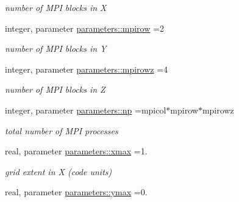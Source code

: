 \begin{DoxyCompactItemize}
\begin{DoxyCompactList}\small\item\em number of M\+P\+I blocks in X \end{DoxyCompactList}\item 
\hypertarget{namespaceparameters_a15b7777c042a615b8c2d18578682e177}{}integer, parameter \hyperlink{namespaceparameters_a15b7777c042a615b8c2d18578682e177}{parameters\+::mpirow} =2\label{namespaceparameters_a15b7777c042a615b8c2d18578682e177}

\begin{DoxyCompactList}\small\item\em number of M\+P\+I blocks in Y \end{DoxyCompactList}\item 
\hypertarget{namespaceparameters_aeb329f6b921d76584073753e2596e410}{}integer, parameter \hyperlink{namespaceparameters_aeb329f6b921d76584073753e2596e410}{parameters\+::mpirowz} =4\label{namespaceparameters_aeb329f6b921d76584073753e2596e410}

\begin{DoxyCompactList}\small\item\em number of M\+P\+I blocks in Z \end{DoxyCompactList}\item 
\hypertarget{namespaceparameters_af4a703fa8afb09b800dbca84a465ed73}{}integer, parameter \hyperlink{namespaceparameters_af4a703fa8afb09b800dbca84a465ed73}{parameters\+::np} =mpicol$\ast$mpirow$\ast$mpirowz\label{namespaceparameters_af4a703fa8afb09b800dbca84a465ed73}

\begin{DoxyCompactList}\small\item\em total number of M\+P\+I processes \end{DoxyCompactList}\item 
\hypertarget{namespaceparameters_a52f0c9493ee24c99cb8fad63d3ecddc8}{}real, parameter \hyperlink{namespaceparameters_a52f0c9493ee24c99cb8fad63d3ecddc8}{parameters\+::xmax} =1.\label{namespaceparameters_a52f0c9493ee24c99cb8fad63d3ecddc8}

\begin{DoxyCompactList}\small\item\em grid extent in X (code units) \end{DoxyCompactList}\item 
\hypertarget{namespaceparameters_af38b91fa583e6da2e09cac965ad56fcf}{}real, parameter \hyperlink{namespaceparameters_af38b91fa583e6da2e09cac965ad56fcf}{parameters\+::ymax} =0.\label{namespaceparameters_af38b91fa583e6da2e09cac965ad56fcf}


\end{DoxyCompactItemize}
